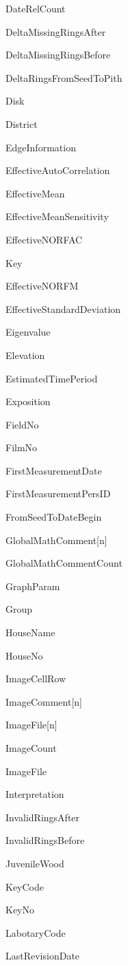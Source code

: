 \documentclass[10pt, headsepline,DIV14,BCOR0.5cm]{scrreprt}
\begin{document}
\begin{multicols}{2}
\begin{itemize*}
 \item  DateRelCount
 \item  DeltaMissingRingsAfter
 \item  DeltaMissingRingsBefore
 \item  DeltaRingsFromSeedToPith
 \item  Disk
 \item  District
 \item  EdgeInformation
 \item  EffectiveAutoCorrelation
 \item  EffectiveMean
 \item  EffectiveMeanSensitivity
 \item  EffectiveNORFAC
 \item  Key
 \item  EffectiveNORFM
 \item  EffectiveStandardDeviation
 \item  Eigenvalue
 \item  Elevation
 \item  EstimatedTimePeriod
 \item  Exposition
 \item  FieldNo
 \item  FilmNo
 \item  FirstMeasurementDate
 \item  FirstMeasurementPersID
 \item  FromSeedToDateBegin
 \item  GlobalMathComment[n]
 \item  GlobalMathCommentCount
 \item  GraphParam
 \item  Group
 \item  HouseName
 \item  HouseNo
 \item  ImageCellRow
 \item  ImageComment[n]
 \item  ImageFile[n]
 \item  ImageCount
 \item  ImageFile
 \item  Interpretation
 \item  InvalidRingsAfter
 \item  InvalidRingsBefore
 \item  JuvenileWood
 \item  KeyCode
 \item  KeyNo
 \item  LabotaryCode
 \item  LastRevisionDate

\end{itemize*}
\end{multicols}
\end{document}
